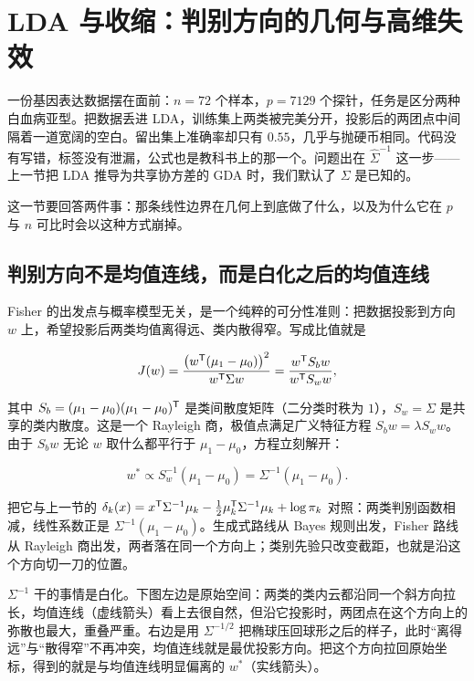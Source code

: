 \section{LDA 与收缩：判别方向的几何与高维失效}
\label{sec:13-Machine-Learning/06-Probabilistic-Models/02}

一份基因表达数据摆在面前：\(n=72\) 个样本，\(p=7129\) 个探针，任务是区分两种白血病亚型。把数据丢进 LDA，训练集上两类被完美分开，投影后的两团点中间隔着一道宽阔的空白。留出集上准确率却只有 \(0.55\)，几乎与抛硬币相同。代码没有写错，标签没有泄漏，公式也是教科书上的那一个。问题出在 \(\widehat\Sigma^{-1}\) 这一步——上一节把 LDA 推导为共享协方差的 GDA 时，我们默认了 \(\Sigma\) 是已知的。

这一节要回答两件事：那条线性边界在几何上到底做了什么，以及为什么它在 \(p\) 与 \(n\) 可比时会以这种方式崩掉。

\subsection{判别方向不是均值连线，而是白化之后的均值连线}

Fisher 的出发点与概率模型无关，是一个纯粹的可分性准则：把数据投影到方向 \(w\) 上，希望投影后两类均值离得远、类内散得窄。写成比值就是

\[
J(w)=\frac{\bigl(w^{\mathsf{T}}(\mu_1-\mu_0)\bigr)^2}{w^{\mathsf{T}}\Sigma w}
=\frac{w^{\mathsf{T}}S_bw}{w^{\mathsf{T}}S_ww},
\]

其中 \(S_b=(\mu_1-\mu_0)(\mu_1-\mu_0)^{\mathsf{T}}\) 是类间散度矩阵（二分类时秩为 \(1\)），\(S_w=\Sigma\) 是共享的类内散度。这是一个 Rayleigh 商，极值点满足广义特征方程 \(S_bw=\lambda S_ww\)。由于 \(S_bw\) 无论 \(w\) 取什么都平行于 \(\mu_1-\mu_0\)，方程立刻解开：

\[
w^{\ast}\propto S_w^{-1}(\mu_1-\mu_0)=\Sigma^{-1}(\mu_1-\mu_0).
\]

把它与上一节的 \(\delta_k(x)=x^{\mathsf{T}}\Sigma^{-1}\mu_k-\tfrac12\mu_k^{\mathsf{T}}\Sigma^{-1}\mu_k+\log\pi_k\) 对照：两类判别函数相减，线性系数正是 \(\Sigma^{-1}(\mu_1-\mu_0)\)。生成式路线从 Bayes 规则出发，Fisher 路线从 Rayleigh 商出发，两者落在同一个方向上；类别先验只改变截距，也就是沿这个方向切一刀的位置。

\(\Sigma^{-1}\) 干的事情是白化。下图左边是原始空间：两类的类内云都沿同一个斜方向拉长，均值连线（虚线箭头）看上去很自然，但沿它投影时，两团点在这个方向上的弥散也最大，重叠严重。右边是用 \(\Sigma^{-1/2}\) 把椭球压回球形之后的样子，此时``离得远''与``散得窄''不再冲突，均值连线就是最优投影方向。把这个方向拉回原始坐标，得到的就是与均值连线明显偏离的 \(w^{\ast}\)（实线箭头）。

